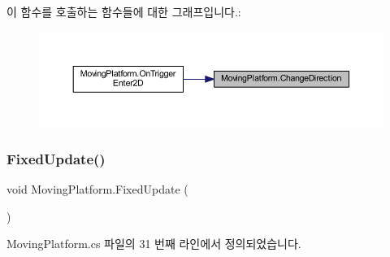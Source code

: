 \begin{DoxyCode}{0}

\end{DoxyCode}
이 함수를 호출하는 함수들에 대한 그래프입니다.\+:\nopagebreak
\begin{figure}[H]
\begin{center}
\leavevmode
\includegraphics[width=350pt]{df/d42/class_moving_platform_a98f73c545d68839bcb755a4b638422b5_icgraph}
\end{center}
\end{figure}
\mbox{\label{class_moving_platform_a935710333a3a0f0164dad887e8eb7d1c}} 
\subsubsection{\texorpdfstring{FixedUpdate()}{FixedUpdate()}}
{\footnotesize\ttfamily void Moving\+Platform.\+Fixed\+Update (\begin{DoxyParamCaption}{ }\end{DoxyParamCaption})\hspace{0.3cm}{\ttfamily [private]}}



Moving\+Platform.\+cs 파일의 31 번째 라인에서 정의되었습니다.


